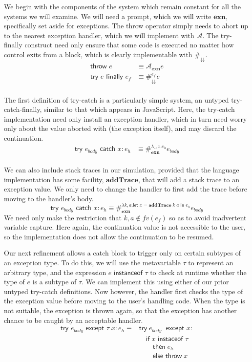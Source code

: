\documentclass[11pt]{article}
\newcommand{\letin}[2]{\textsf{let }#1\textsf{ in }#2}
\newcommand\A{\mathcal{A}}
\begin{document}
We begin with the components of the system which remain constant for all the systems we will examine.
We will need a prompt, which we will write $\mathbf{exn}$, specifically set aside for exceptions.
The throw operator simply needs to abort up to the nearest exception handler, which we will implement with $\A$.
The try-finally construct need only ensure that some code is executed no matter how control exits from a block, which is clearly implementable with $\#_\downdownarrows$.
\begin{align*}
\textsf{throw }e &\equiv \A_\textbf{exn}e \\
\textsf{try }e\textsf{ finally }e_f &\equiv
	\#_\downdownarrows^{e_f}e \\
\end{align*}

The first definition of try-catch is a particularly simple system, an untyped try-catch-finally, similar to that which appears in JavaScript.
Here, the try-catch implementation need only install an exception handler, which in turn need worry only about the value aborted with (the exception itself), and may discard the continuation.
\begin{align*}
\textsf{try }e_{body}\textsf{ catch }x:e_h &\equiv
	\#_\textbf{exn}^{\lambda \_,x.{e_h}}e_{body}
	\\
\end{align*}

We can also include stack traces in our simulation, provided that the language implementation has some facility, $\mathbf{addTrace}$, that will add a stack trace to an exception value.
We only need to change the handler to first add the trace before moving to the handler's body.
$$\textsf{try }e_{body}\textsf{ catch }x:e_h \equiv
	\#_\textbf{exn}^{\lambda k,a.{\letin{x=\mathbf{addTrace}\;k\;a}{e_h}}}e_{body}$$
We need only make the restriction that $k,a \notin fv(e_f)$ so as to avoid inadvertent variable capture.
Here again, the continuation value is not accessible to the user, so the implementation does not allow the continuation to be resumed.

Our next refinement allows a catch block to trigger only on certain subtypes of an exception type.
To do this, we will use the metavariable $\tau$ to represent an arbitrary type, and the expression $e\textsf{ instanceof }\tau$ to check at runtime whether the type of $e$ is a subtype of $\tau$.
We can implement this using either of our prior untyped try-catch definitions.
Now however, the handler first checks the type of the exception value before moving to the user's handling code.
When the type is not suitable, the exception is thrown again, so that the exception has another chance to be caught by an acceptable handler.
\begin{align*}
\textsf{try }e_{body}\textsf{ except }\tau\;x:e_h \equiv{}
	&\textsf{try}\;e_{body}\;\textsf{ except }x: \\
	&\quad\textsf{if}\;x\textsf{ instaceof }\tau\\
	&\qquad\textsf{then}\;e_h \\
	&\qquad\textsf{else throw}\;x \\
\end{align*}
\end{document}
